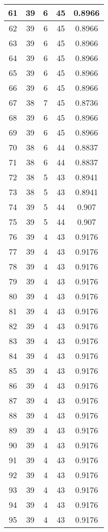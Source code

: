 \documentclass[letterpaper, 12pt]{article}
\begin{document}
\begin{longtable}{|c|c|c|c|c|}
61 & 39 & 6 & 45 & 0.8966 \\
\hline
62 & 39 & 6 & 45 & 0.8966 \\
\hline
63 & 39 & 6 & 45 & 0.8966 \\
\hline
64 & 39 & 6 & 45 & 0.8966 \\
\hline
65 & 39 & 6 & 45 & 0.8966 \\
\hline
66 & 39 & 6 & 45 & 0.8966 \\
\hline
67 & 38 & 7 & 45 & 0.8736 \\
\hline
68 & 39 & 6 & 45 & 0.8966 \\
\hline
69 & 39 & 6 & 45 & 0.8966 \\
\hline
70 & 38 & 6 & 44 & 0.8837 \\
\hline
71 & 38 & 6 & 44 & 0.8837 \\
\hline
72 & 38 & 5 & 43 & 0.8941 \\
\hline
73 & 38 & 5 & 43 & 0.8941 \\
\hline
74 & 39 & 5 & 44 & 0.907 \\
\hline
75 & 39 & 5 & 44 & 0.907 \\
\hline
76 & 39 & 4 & 43 & 0.9176 \\
\hline
77 & 39 & 4 & 43 & 0.9176 \\
\hline
78 & 39 & 4 & 43 & 0.9176 \\
\hline
79 & 39 & 4 & 43 & 0.9176 \\
\hline
80 & 39 & 4 & 43 & 0.9176 \\
\hline
81 & 39 & 4 & 43 & 0.9176 \\
\hline
82 & 39 & 4 & 43 & 0.9176 \\
\hline
83 & 39 & 4 & 43 & 0.9176 \\
\hline
84 & 39 & 4 & 43 & 0.9176 \\
\hline
85 & 39 & 4 & 43 & 0.9176 \\
\hline
86 & 39 & 4 & 43 & 0.9176 \\
\hline
87 & 39 & 4 & 43 & 0.9176 \\
\hline
88 & 39 & 4 & 43 & 0.9176 \\
\hline
89 & 39 & 4 & 43 & 0.9176 \\
\hline
90 & 39 & 4 & 43 & 0.9176 \\
\hline
91 & 39 & 4 & 43 & 0.9176 \\
\hline
92 & 39 & 4 & 43 & 0.9176 \\
\hline
93 & 39 & 4 & 43 & 0.9176 \\
\hline
94 & 39 & 4 & 43 & 0.9176 \\
\hline
95 & 39 & 4 & 43 & 0.9176 \\

\end{longtable}
\end{document}
